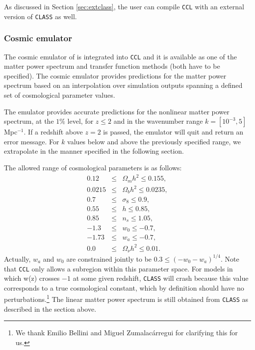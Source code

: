 \documentclass[\docopts]{\docclass}
\newcommand{\ccl}{{\tt CCL}\xspace}
\begin{document}
As discussed in Section \ref{sec:extclass}, the user can compile \ccl with an external version of {\tt CLASS} as well.

\subsubsection{Cosmic emulator}

The cosmic emulator of \citet{Lawrence17} is integrated into \ccl and it is available as one of the matter power spectrum and transfer function methods (both have to be specified). The cosmic emulator provides predictions for the matter power spectrum based on an interpolation over simulation outputs spanning a defined set of cosmological parameter values.

The emulator provides accurate predictions for the nonlinear matter power spectrum, at the $1\%$ level, for $z\leq 2$ and in the wavenumber range $k=[10^{-3},5]$ Mpc$^{-1}$. If a redshift above $z=2$ is passed, the emulator will quit and return an error message. For $k$ values below and above the previously specified range, we extrapolate in the manner specified in the following section.

The allowed range of cosmological parameters is as follows:
\begin{eqnarray}
0.12&\leq& \Omega_m h^2 \leq 0.155,\nonumber\\
0.0215&\leq& \Omega_b h^2 \leq 0.0235,\nonumber\\
0.7&\leq& \sigma_8 \leq 0.9,\nonumber\\
0.55&\leq& h \leq 0.85,\nonumber\\
0.85&\leq& n_s\leq 1.05,\nonumber\\
-1.3&\leq& w_0\leq-0.7,\nonumber\\
-1.73&\leq& w_a\leq -0.7,\nonumber\\
0.0&\leq& \Omega_\nu h^2 \leq 0.01.
\end{eqnarray}
Actually, $w_a$ and $w_0$ are constrained jointly to be $0.3\leq (-w_0-w_a)^{1/4}$. Note that \ccl only allows a subregion within this parameter space. For models in which w(z) crosses $-1$ at some given redshift, {\tt CLASS} will crash because this value corresponds to a true cosmological constant, which by definition should have no perturbations.\footnote{We thank Emilio Bellini and Miguel Zumalac\'arregui for clarifying this for us.} The linear matter power spectrum is still obtained from {\tt CLASS} as described in the section above.
\end{document}

